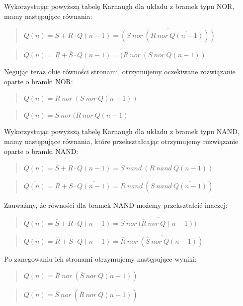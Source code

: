 \documentclass[12pt,a4paper]{article}
\begin{document}
Wykorzystując powyższą tabelę Karnaugh dla układu z bramek typu NOR, mamy następujące równania:
\begin{verse}
\centering
$Q(n) = S + \overline{R} \cdot Q(n-1) = \overline{(S \ nor \ (R \ nor \  \overline{Q(n-1)}))}$
\end{verse}
\begin{verse}
\centering
$\overline{Q(n)} = R + \overline{S} \cdot \overline{Q(n-1)}= \overline{(R \ nor \ (S \ nor \  Q(n-1))} $
\end{verse}
Negując teraz obie równości stronami, otrzymujemy oczekiwane rozwiązanie oparte o bramki NOR:
\begin{verse}
\centering
$Q(n) = R \ nor \ (S \ nor \ Q(n-1)) $ \\
\end{verse}
\begin{verse}
\centering
$\overline{Q(n)} = S \ nor \ (R \ nor \ \overline{Q(n-1)}$
\end{verse}

Wykorzystując powyższą tabelę Karnaugh dla układu z bramek typu NAND, mamy następujące równania, które przekształcając otrzymujemy rozwiązanie oparte o bramki NAND:
\begin{verse}
\centering
$Q(n) =  \overline{S} + R \cdot Q(n-1) = S \ nand \ (R \ nand \ Q(n-1))$
\end{verse}
\begin{verse}
\centering
$\overline{Q(n)} = \overline{R} + S \cdot \overline{Q(n-1)}  = R \ nand \ (S \ nand \ \overline{Q(n-1)}) $
\end{verse}

Zauważmy, że równości dla bramek NAND możemy przekształcić inaczej:
\begin{verse}
\centering
$Q(n) =  \overline{S} + R \cdot Q(n-1) = \overline{\overline{S} \ nor \ (\overline{R} \ nor \ \overline{Q(n-1))}}$
\end{verse}
\begin{verse}
\centering
$\overline{Q(n)} = \overline{R} + S \cdot \overline{Q(n-1)}  = \overline{\overline{R} \ nor \ (\overline{S} \ nor \ Q(n-1))} $
\end{verse}
Po zanegowaniu ich stronami otrzymujemy następujące wyniki:
\begin{verse}
\centering
$Q(n) = \overline{R} \ nor \ (\overline{S} \ nor \ Q(n-1)) $ \\
\end{verse}
\begin{verse}
\centering
$\overline{Q(n)} = \overline{S} \ nor \ (\overline{R} \ nor \ \overline{Q(n-1)})$
\end{verse}
\end{document}
